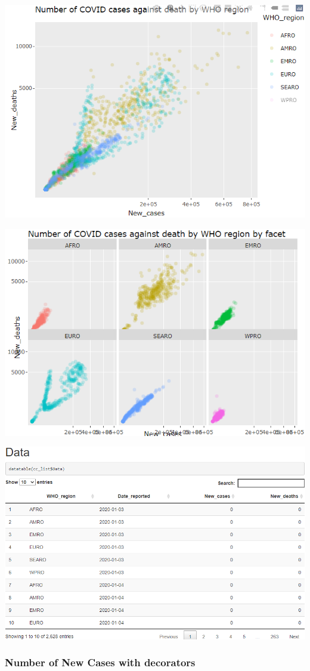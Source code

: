 \documentclass[
]{article}
\begin{document}
\includegraphics[width=0.8\linewidth]{latexpics/decoratorexample3}

\includegraphics[width=0.8\linewidth]{latexpics/decoratorexample4}

\includegraphics[width=0.8\linewidth]{latexpics/decoratorexample5}

\hypertarget{number-of-new-cases-with-decorators}{%
\subsubsection{Number of New Cases with
decorators}\label{number-of-new-cases-with-decorators}}
\end{document}
